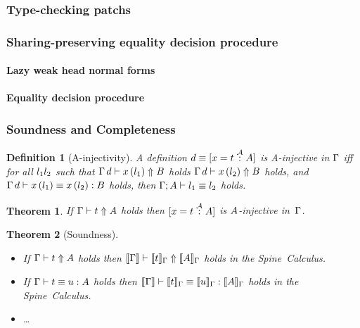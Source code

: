 \documentclass[9pt,authoryear]{sigplanconf}
\newtheorem{theorem}{Theorem}
\newtheorem{definition}{Definition}
\begin{document}
\subsubsection{Type-checking patchs}


\subsubsection{Sharing-preserving equality decision procedure}

\paragraph{Lazy weak head normal forms}


\paragraph{Equality decision procedure}


\subsubsection{Soundness and Completeness}

\begin{definition}[A-injectivity]
A definition $d \equiv [x = t \stackrel{\mathcal{A}}{:} A]$ is A-injective
in $\Gamma$ iff for all $l_1 l_2$ such that
$\Gamma \, d \vdash x\,(l_1) \Uparrow B$ holds
$\Gamma \, d \vdash x\,(l_2) \Uparrow B$
holds, and
$\Gamma \, d \vdash x\,(l_1) \equiv x\,(l_2) : B$
holds, then $\Gamma; A \vdash l_1 \equiv l_2$ holds. 
\end{definition}

\begin{theorem}
If $\Gamma \vdash t \Uparrow A$ holds then $[x = t \stackrel{\mathcal{A}}{:} A]$ is
$A$-injective in~$\Gamma$.
\end{theorem}

\begin{theorem}[Soundness]\ \\[-1em]
\begin{itemize}
\item  If $\Gamma \vdash t \Uparrow A$ holds then 
$\llbracket \Gamma \rrbracket \vdash \llbracket t \rrbracket_{\Gamma} \Uparrow \llbracket A \rrbracket_{\Gamma}$
holds in the Spine~Calculus. 
\item If $\Gamma \vdash t \equiv u : A$ holds then
$\llbracket \Gamma \rrbracket \vdash \llbracket t \rrbracket_{\Gamma} \equiv \llbracket u \rrbracket_{\Gamma} : \llbracket A \rrbracket_{\Gamma}$
holds in the Spine~Calculus. 
\item \ldots
\end{itemize}
\end{theorem}
\end{document}
